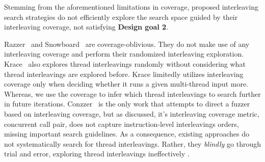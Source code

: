 







%
Stemming from the aforementioned limitations in coverage, 
proposed interleaving search strategies do not efficiently 
explore the search space guided by their interleaving coverage,
not satisfying \textbf{Design goal 2}.

Razzer~\cite{razzer} and Snowboard~\cite{snowboard} are coverage-oblivious.
They do not make use of any interleaving coverage 
and perform their randomized interleaving exploration.
%
Krace~\cite{krace} also explores thread interleavings randomly without
considering what thread interleavings are explored before.  Krace
limitedly utilizes interleaving coverage only when deciding whether it
runs a given multi-thread input more. Whereas, we use the coverage to
infer which thread interleavings to search further in future
iterations.
%
Conzzer~\cite{conzzer} is the only work that attempts to direct a
fuzzer based on interleaving coverage, but as discussed,  
it's interleaving coverage metric, concurrent call pair, does not capture instruction-level interleavings orders, missing important 
search guidelines.
%
As a consequence, existing approaches do not systematically search for
thread interleavings.  Rather, they \textit{blindly} go through
trial and error, exploring thread interleavings ineffectively .

